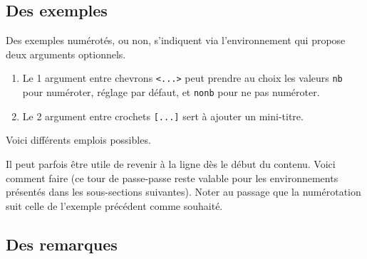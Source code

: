 

\subsection{Des exemples}

Des exemples numérotés, ou non, s'indiquent via l'environnement  qui propose deux arguments optionnels.

\begin{enumerate}
    \item Le 1\ier{} argument entre chevrons \verb#<...># peut prendre au choix les valeurs \verb#nb# pour numéroter, réglage par défaut, et \verb#nonb# pour ne pas numéroter.

    \item Le 2\ieme{} argument entre crochets \verb#[...]# sert à ajouter un mini-titre.
\end{enumerate}


Voici différents emplois possibles.









\begin{bdoctip}
    Il peut parfois être utile de revenir à la ligne dès le début du contenu. Voici comment faire (ce tour de passe-passe reste valable pour les environnements présentés dans les sous-sections suivantes). Noter au passage que la numérotation suit celle de l'exemple précédent comme souhaité.

\end{bdoctip}



\subsection{Des remarques}

